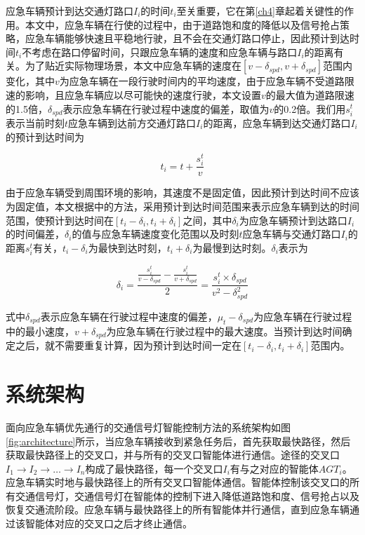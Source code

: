 应急车辆预计到达交通灯路口${I_i}$的时间${t_i}$至关重要，它在第\ref{ch4}章起着关键性的作用。本文中，应急车辆在行使的过程中，由于道路饱和度的降低以及信号抢占策略，应急车辆能够快速且平稳地行驶，且不会在交通灯路口停止，因此预计到达时间${t_i}$不考虑在路口停留时间，只跟应急车辆的速度和应急车辆与路口${I_i}$的距离有关。为了贴近实际物理场景，本文中应急车辆的速度在${[v-\delta_{spd}, v+\delta_{spd}]}$范围内变化，其中${v}$为应急车辆在一段行驶时间内的平均速度，由于应急车辆不受道路限速的影响，且应急车辆应以尽可能快的速度行驶，本文设置${v}$的最大值为道路限速的1.5倍，${\delta_{spd}}$表示应急车辆在行驶过程中速度的偏差，取值为${v}$的0.2倍。我们用${s_i^t}$表示当前时刻${t}$应急车辆到达前方交通灯路口${I_i}$的距离，应急车辆到达交通灯路口${I_i}$的预计到达时间为

\begin{equation}
	t_i= t + \frac{s_i^t}{v} 
	\label{equation:t_i}
\end{equation}

由于应急车辆受到周围环境的影响，其速度不是固定值，因此预计到达时间不应该为固定值，本文根据\cite{min}中的方法，采用预计到达时间范围来表示应急车辆到达的时间范围，使预计到达时间在${[t_i-\delta_i, t_i+\delta_i]}$之间，其中${\delta_i}$为应急车辆预计到达路口${I_i}$的时间偏差，${\delta_i}$的值与应急车辆速度变化范围以及时刻${t}$应急车辆与交通灯路口${I_i}$的距离${s_i^t}$有关，${t_i-\delta_i}$为最快到达时刻，${t_i+\delta_i}$为最慢到达时刻。${\delta_i}$表示为

\begin{equation}
	\delta_i=\frac{\frac{s_i^t}{v-\delta_{spd}}-\frac{s_i^t}{v+\delta_{spd}}}{2}=\frac{s_i^t\times\delta_{spd}}{v^2-\delta_{spd}^2}
	\label{equation:delta_i}
\end{equation}

式中${\delta_{spd}}$表示应急车辆在行驶过程中速度的偏差，${\mu_t-\delta_{spd}}$为应急车辆在行驶过程中的最小速度，${v+\delta_{spd}}$为应急车辆在行驶过程中的最大速度。当预计到达时间确定之后，就不需要重复计算，因为预计到达时间一定在${[t_i-\delta_i, t_i+\delta_i]}$范围内。

\section{系统架构}
面向应急车辆优先通行的交通信号灯智能控制方法的系统架构如图\ref{fig:architecture}所示，当应急车辆接收到紧急任务后，首先获取最快路径，然后获取最快路径上的交叉口，并与所有的交叉口智能体进行通信。途径的交叉口${I_1 \to I_2 \to \ldots \to I_n}$构成了最快路径，每一个交叉口${I_i}$有与之对应的智能体${AGT_i}$。应急车辆实时地与最快路径上的所有交叉口智能体通信。智能体控制该交叉口的所有交通信号灯，交通信号灯在智能体的控制下进入降低道路饱和度、信号抢占以及恢复交通流阶段。应急车辆与最快路径上的所有智能体并行通信，直到应急车辆通过该智能体对应的交叉口之后才终止通信。

